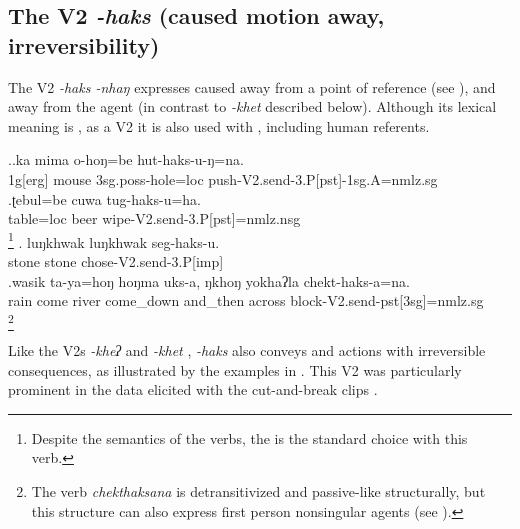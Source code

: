 \subsection{The V2 \emph{-haks} (caused motion away, irreversibility)}\label{V2-send}%

The V2 \emph{-haks \ti -nhaŋ}  expresses caused  away from a point of reference (see \Next),  and away from the agent (in contrast to \emph{-khet}  described below).  Although its lexical meaning is , as a V2 it is also used with , including human referents.


\ex.\ag.ka mima o-hoŋ=be hut-haks-u-ŋ=na.\\
{\sc 1g[erg]} mouse  {\sc 3sg.poss-}hole{\sc =loc} push{\sc -V2.send-3.P[pst]-1sg.A=nmlz.sg}\\
\bg.ʈebul=be cuwa tug-haks-u=ha.\\
table{\sc =loc} beer wipe{\sc -V2.send-3.P[pst]=nmlz.nsg}\\
\footnote{Despite the  semantics of the verbs, the  is the standard  choice with this verb.}
\bg. luŋkhwak luŋkhwak seg-haks-u.\\
stone stone chose{\sc -V2.send-3.P[imp]}\\
\bg.wasik ta-ya=hoŋ hoŋma uks-a, ŋkhoŋ yokhaʔla chekt-haks-a=na.\\
rain  come river come\_down and\_then across block{\sc -V2.send-pst[3sg]=nmlz.sg}\\
\footnote{The verb \emph{chekthaksana} is detransitivized and passive-like structurally, but this structure can also express first person nonsingular agents (see ).}


Like the V2s \emph{-kheʔ}  and \emph{-khet} , \emph{-haks}  also conveys  and actions with irreversible consequences, as illustrated by the examples in \Next. This V2 was  particularly prominent in the data elicited with the cut-and-break clips   \citep{Bohnemeyeretal2010_cut}.

